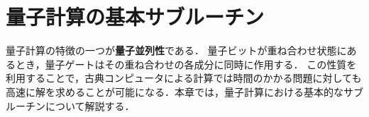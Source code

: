 \chapter{量子計算の基本サブルーチン}
\label{chap:quantum-subroutines}

量子計算の特徴の一つが\textbf{量子並列性}である．
量子ビットが重ね合わせ状態にあるとき，量子ゲートはその重ね合わせの各成分に同時に作用する．
この性質を利用することで，古典コンピュータによる計算では時間のかかる問題に対しても高速に解を求めることが可能になる．本章では，量子計算における基本的なサブルーチンについて解説する．




